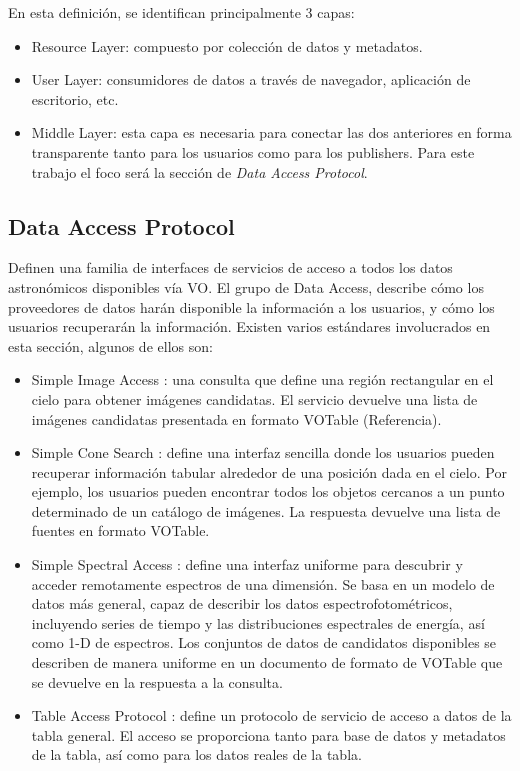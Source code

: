 En esta definición, se identifican principalmente 3 capas:
\begin{itemize}
	\item Resource Layer: compuesto por colección de datos y metadatos.
	\item User Layer: consumidores de datos a través de navegador,
aplicación de escritorio, etc.
	\item Middle Layer: esta capa es necesaria para conectar las dos
anteriores en forma transparente tanto para los usuarios como para los
publishers. Para este trabajo el foco será la sección de \emph{Data Access Protocol}.
\end{itemize}

\subsection{Data Access Protocol}

Definen una familia de interfaces de servicios de acceso a todos los datos
astronómicos disponibles vía VO.  El grupo de Data Access, describe cómo los
proveedores de datos harán disponible la información a los usuarios, y cómo los
usuarios recuperarán la información. Existen varios estándares involucrados
en esta sección, algunos de ellos son:

\begin{itemize}
	\item Simple Image Access \cite{sia}: una consulta que define una región
rectangular en el cielo para obtener imágenes candidatas. El servicio devuelve
una lista de imágenes candidatas presentada en formato VOTable (Referencia).
	\item Simple Cone Search \cite{scs}: define una interfaz sencilla donde los
usuarios pueden recuperar información tabular alrededor de una posición dada en
el cielo. Por ejemplo, los usuarios pueden encontrar todos los objetos cercanos
a un punto determinado de un catálogo de imágenes. La respuesta devuelve una
lista de fuentes en formato VOTable.
	\item Simple Spectral Access \cite{ssa}: define una interfaz uniforme para
descubrir y acceder remotamente espectros de una dimensión. Se basa en un
modelo de datos más general, capaz de describir los datos espectrofotométricos,
incluyendo series de tiempo y las distribuciones espectrales de energía, así
como 1-D de espectros. Los conjuntos de datos de candidatos disponibles se
describen de manera uniforme en un documento de formato de VOTable que se
devuelve en la respuesta a la consulta.
	\item Table Access Protocol \cite{tap}: define un protocolo de servicio de acceso
a datos de la tabla general. El acceso se proporciona tanto para base de datos
y metadatos de la tabla, así como para los datos reales de la tabla.
\end{itemize}
